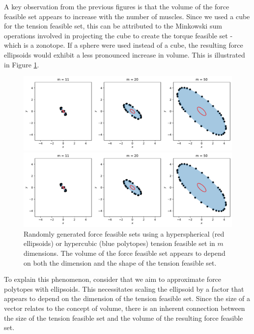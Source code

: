 A key observation from the previous figures is that the volume of the force feasible set appears to increase with the number of muscles.  Since we used a cube for the tension feasible set, this can be attributed to the Minkowski sum operations involved in projecting the cube to create the torque feasible set - which is a zonotope.  If a sphere were used instead of a cube, the resulting force ellipsoids would exhibit a less pronounced increase in volume. This is illustrated in Figure \ref{fig:ellipsoid_scale}.
\begin{figure}[!htb]
  \captionsetup{justification=centering}
  \begin{minipage}{1\linewidth}
    \centering
    \includegraphics[trim={0 261 0 0},clip, width=0.9\linewidth]{img/chapter_3/ellipsoids_size.pdf}
  \end{minipage}
  \begin{minipage}{1\linewidth}
    \centering
    \includegraphics[trim={0 0 0 20},clip, width=0.9\linewidth]{img/chapter_3/ellipsoids_size.pdf}
  \end{minipage}
  
  \caption{Randomly generated force feasible sets using a hyperspherical (red ellipsoids) or hypercubic (blue polytopes) tension feasible set in $m$ dimensions. The volume of the force feasible set appears to depend on both the dimension and the shape of the tension feasible set.}
  \label{fig:ellipsoid_scale}
\end{figure}

To explain this phenomenon, consider that we aim to approximate force polytopes with ellipsoids. This necessitates scaling the ellipsoid by a factor that appears to depend on the dimension of the tension feasible set. Since the size of a vector relates to the concept of volume, there is an inherent connection between the size of the tension feasible set and the volume of the resulting force feasible set.

